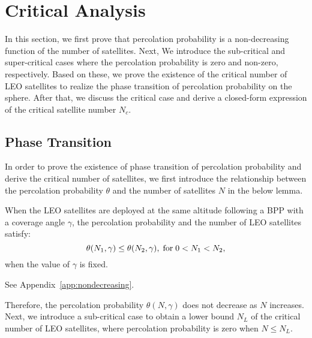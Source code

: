 \documentclass[final]{IEEEtran}
\begin{document}


\section{Critical Analysis}\label{sec:critical}
In this section, we first prove that percolation probability is a non-decreasing function of the number of satellites. Next, We introduce the sub-critical and super-critical cases where the percolation probability is zero and non-zero, respectively. Based on these, we prove the existence of the critical number of LEO satellites to realize the phase transition of percolation probability on the sphere. After that, we discuss the critical case and derive a closed-form expression of the critical satellite number $N_c$.  
\subsection{Phase Transition}\label{subsec:phasetransition}
  
 \indent In order to prove the existence of phase transition of percolation probability and derive the critical number of satellites, we first introduce the relationship between the percolation probability $\theta$ and the number of satellites $N$ in the below lemma.
\begin{lemma}\label{lem:nondecreasing}
    When the LEO satellites are deployed at the same altitude following a BPP with a coverage angle $\gamma$, the percolation probability and the number of LEO satellites satisfy:
    \begin{equation}
        \theta(N_1,\gamma)\leq\theta(N_2,\gamma), \;{\rm for}\; 0<N_1<N_2,
    \end{equation}
when the value of $\gamma$ is fixed.
\end{lemma}
\begin{IEEEproof}
    See Appendix~\ref{app:nondecreasing}.
\end{IEEEproof}
\indent Therefore, the percolation probability $\theta(N,\gamma)$ does not decrease as $N$ increases. Next, we introduce a sub-critical case to obtain a lower bound $N_L$ of the critical number of LEO satellites, where percolation probability is zero when $N\leq N_L$.\\
\end{document}
